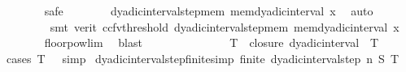 \begin{isabellebody}
\ \ \ \ \ \ \isamarkupfalse%
\ safe\isanewline
\ \ \ \ \ \ \isamarkupfalse%
\ dyadic{\isacharunderscore}{\kern0pt}interval{\isacharunderscore}{\kern0pt}step{\isacharunderscore}{\kern0pt}mem\ mem{\isacharunderscore}{\kern0pt}dyadic{\isacharunderscore}{\kern0pt}interval\ x{\isacharparenleft}{\kern0pt}{}{\isacharcomma}{\kern0pt}{}{\isacharparenright}{\kern0pt}\ \isamarkupfalse%
\ auto{\isacharbrackleft}{\kern0pt}{}{\isacharbrackright}{\kern0pt}\isanewline
\ \ \ \ \ \ \ \isamarkupfalse%
\ {\isacharparenleft}{\kern0pt}smt\ {\isacharparenleft}{\kern0pt}verit{\isacharcomma}{\kern0pt}\ ccfv{\isacharunderscore}{\kern0pt}threshold{\isacharparenright}{\kern0pt}\ dyadic{\isacharunderscore}{\kern0pt}interval{\isacharunderscore}{\kern0pt}step{\isacharunderscore}{\kern0pt}mem\ mem{\isacharunderscore}{\kern0pt}dyadic{\isacharunderscore}{\kern0pt}interval\ x{\isacharparenright}{\kern0pt}\isanewline
\ \ \ \ \ \ \isamarkupfalse%
\ floor{\isacharunderscore}{\kern0pt}pow{}{\isacharunderscore}{\kern0pt}lim\ \isamarkupfalse%
\ blast\isanewline
\ \ \ \ \ \ \isamarkupfalse%
\isanewline
\ \ \isamarkupfalse%
\isanewline
\ \ \isamarkupfalse%
\ \isamarkupfalse%
\ {\isachardoublequoteopen}{\isacharbraceleft}{\kern0pt}{}{\isachardot}{\kern0pt}{\isachardot}{\kern0pt}T{\isacharbraceright}{\kern0pt}\ {\isasymsubseteq}\ closure\ {\isacharparenleft}{\kern0pt}dyadic{\isacharunderscore}{\kern0pt}interval\ {}\ T{\isacharparenright}{\kern0pt}{\isachardoublequoteclose}\isanewline
\ \ \ \ \isamarkupfalse%
\ {\isacharparenleft}{\kern0pt}cases\ {\isachardoublequoteopen}T\ {\isasymge}\ {}{\isachardoublequoteclose}{\isacharsemicolon}{\kern0pt}\ simp{\isacharparenright}{\kern0pt}\isanewline
{}\isamarkupfalse%
%
\endisatagproof
{\isafoldproof}%
%
\isadelimproof
%
\endisadelimproof
\isanewline
\isanewline
{}\isamarkupfalse%
\ dyadic{\isacharunderscore}{\kern0pt}interval{\isacharunderscore}{\kern0pt}step{\isacharunderscore}{\kern0pt}finite{\isacharbrackleft}{\kern0pt}simp{\isacharbrackright}{\kern0pt}{\isacharcolon}{\kern0pt}\ {\isachardoublequoteopen}finite\ {\isacharparenleft}{\kern0pt}dyadic{\isacharunderscore}{\kern0pt}interval{\isacharunderscore}{\kern0pt}step\ n\ S\ T{\isacharparenright}{\kern0pt}{\isachardoublequoteclose}\isanewline
%
\isadelimproof
\ \ %
\endisadelimproof
%
\isatagproof
{}\isamarkupfalse%

\end{isabellebody}
